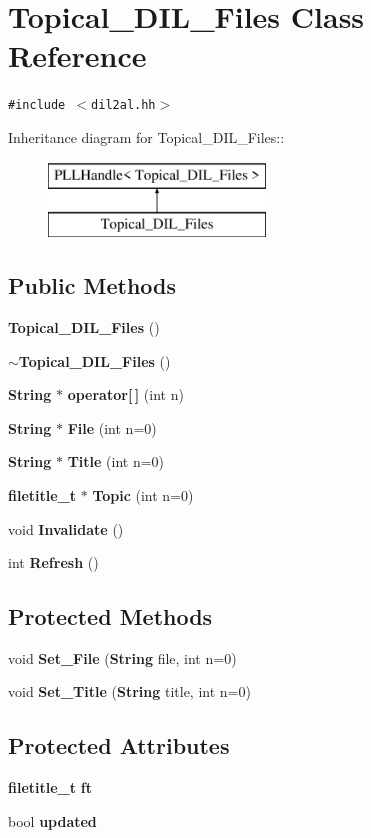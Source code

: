 \section{Topical\_\-DIL\_\-Files  Class Reference}
\label{classTopical__DIL__Files}
{\tt \#include $<$dil2al.hh$>$}

Inheritance diagram for Topical\_\-DIL\_\-Files::\begin{figure}[H]
\begin{center}
\leavevmode
\includegraphics[height=2cm]{classTopical__DIL__Files}
\end{center}
\end{figure}
\subsection*{Public Methods}
\begin{CompactItemize}
\item 
{\bf Topical\_\-DIL\_\-Files} ()
\item 
{\bf $\sim$Topical\_\-DIL\_\-Files} ()
\item 
{\bf String} $\ast$ {\bf operator[$\,$]} (int n)
\item 
{\bf String} $\ast$ {\bf File} (int n=0)
\item 
{\bf String} $\ast$ {\bf Title} (int n=0)
\item 
{\bf filetitle\_\-t} $\ast$ {\bf Topic} (int n=0)
\item 
void {\bf Invalidate} ()
\item 
int {\bf Refresh} ()
\end{CompactItemize}
\subsection*{Protected Methods}
\begin{CompactItemize}
\item 
void {\bf Set\_\-File} ({\bf String} file, int n=0)
\item 
void {\bf Set\_\-Title} ({\bf String} title, int n=0)
\end{CompactItemize}
\subsection*{Protected Attributes}
\begin{CompactItemize}
\item 
{\bf filetitle\_\-t} {\bf ft}
\item 
bool {\bf updated}
\end{CompactItemize}


